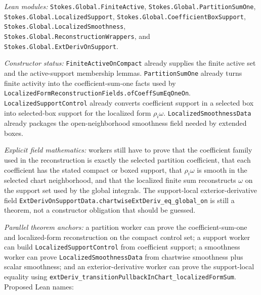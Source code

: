 \begin{definition}
  \label{anc:m6_4_partition_localization_support_control}
  \leanok
  \emph{Lean modules:}
  \texttt{Stokes.Global.FiniteActive},
  \texttt{Stokes.Global.PartitionSumOne},
  \texttt{Stokes.Global.LocalizedSupport},
  \texttt{Stokes.Global.CoefficientBoxSupport},
  \texttt{Stokes.Global.LocalizedSmoothness},
  \texttt{Stokes.Global.ReconstructionWrappers}, and
  \texttt{Stokes.Global.ExtDerivOnSupport}.

  \emph{Constructor status:}
  \texttt{FiniteActiveOnCompact} already supplies the finite active set and
  the active-support membership lemmas.  \texttt{PartitionSumOne} already turns
  finite activity into the coefficient-sum-one facts used by
  \texttt{LocalizedFormReconstructionFields.ofCoeffSumEqOneOn}.
  \texttt{LocalizedSupportControl} already converts coefficient support in a
  selected box into selected-box support for the localized form
  \(\rho_i\omega\).  \texttt{LocalizedSmoothnessData} already packages the
  open-neighborhood smoothness field needed by extended boxes.

  \emph{Explicit field mathematics:}
  workers still have to prove that the coefficient family used in the
  reconstruction is exactly the selected partition coefficient, that each
  coefficient has the stated compact or boxed support, that
  \(\rho_i\omega\) is smooth in the selected chart neighborhood, and that the
  localized finite sum reconstructs \(\omega\) on the support set used by the
  global integrals.  The support-local exterior-derivative field
  \texttt{ExtDerivOnSupportData.chartwiseExtDeriv\_eq\_global\_on} is still a
  theorem, not a constructor obligation that should be guessed.

  \emph{Parallel theorem anchors:}
  a partition worker can prove the coefficient-sum-one and localized-form
  reconstruction on the compact control set; a support worker can build
  \texttt{LocalizedSupportControl} from coefficient support; a smoothness
  worker can prove \texttt{LocalizedSmoothnessData} from chartwise smoothness
  plus scalar smoothness; and an exterior-derivative worker can prove the
  support-local equality using
  \texttt{extDeriv\_transitionPullbackInChart\_localizedFormSum}.
  Proposed Lean names:
\end{definition}

